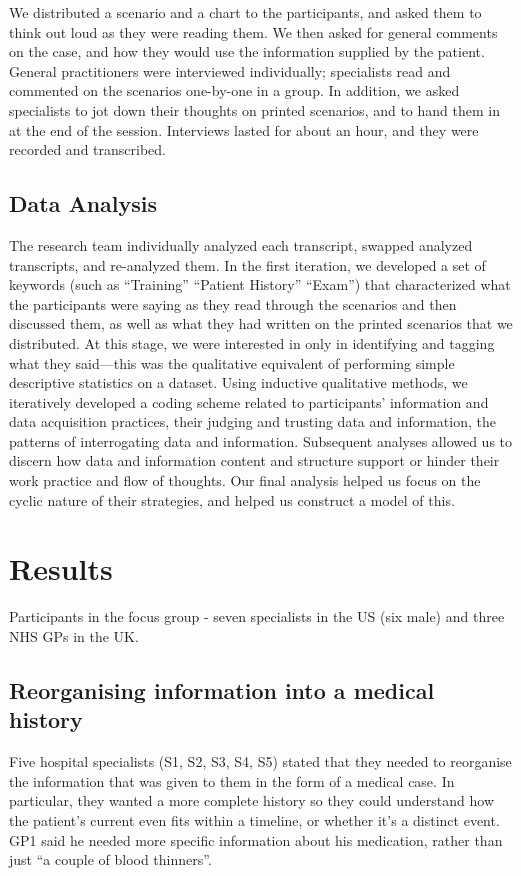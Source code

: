 \documentclass{sigchi}
\begin{document}
We distributed a scenario and a chart to the participants, and asked them to think out loud as they were reading them.  We then asked for general comments on the case, and how they would use the information supplied by the patient.  General practitioners were interviewed individually; specialists read and commented on the scenarios one-by-one in a group.  In addition, we asked specialists to jot down their thoughts on printed scenarios, and to hand them in at the end of the session.  Interviews lasted for about an hour, and they were recorded and transcribed.

\subsection{Data Analysis}
The research team individually analyzed each transcript, swapped analyzed transcripts, and re-analyzed them. \cite{pope2000qualitative}  In the first iteration, we developed a set of keywords (such as “Training” “Patient History” “Exam”) that characterized what the participants were saying as they read through the scenarios and then discussed them, as well as what they had written on the printed scenarios that we distributed. At this stage, we were interested in only in identifying and tagging what they said—this was the qualitative equivalent of performing simple descriptive statistics on a dataset.  Using inductive qualitative methods, \cite{corbin2014basics} we iteratively developed a coding scheme related to participants’ information and data acquisition practices, their judging and trusting data and information, the patterns of interrogating data and information. Subsequent analyses allowed us to discern how data and information content and structure support or hinder their work practice and flow of thoughts.  Our final analysis helped us focus on the cyclic nature of their strategies, and helped us construct a model of this.


\section{Results}

Participants in the focus group - seven specialists in the US (six male) and three NHS GPs in the UK.

    
    
\subsection{Reorganising information into a medical history}
Five hospital specialists (S1, S2, S3, S4, S5) stated that they needed to reorganise the information that was given to them in the form of a medical case. In particular, they wanted a more complete history so they could understand how the patient’s current even fits within a timeline, or whether it’s a distinct event. GP1 said he needed more specific information about his medication, rather than just ``a couple of blood thinners''.
\end{document}
